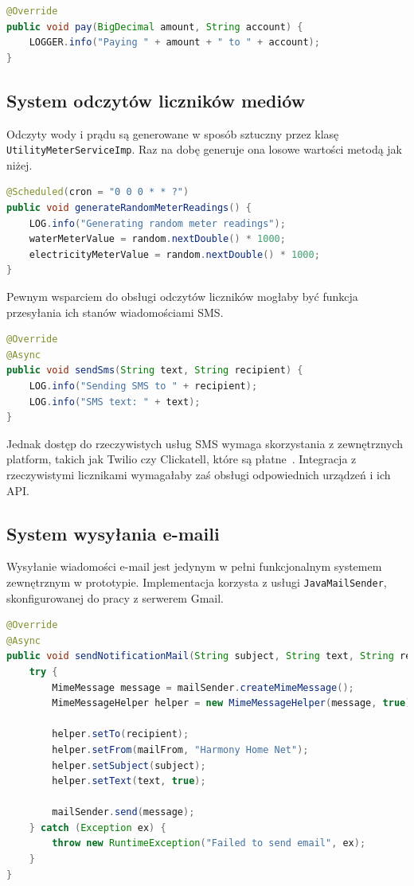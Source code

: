 \begin{lstlisting}[language=Java, style=JavaStyle, caption=Fragment klasy \texttt{BankingServiceImp}]
@Override
public void pay(BigDecimal amount, String account) {
    LOGGER.info("Paying " + amount + " to " + account);
}
\end{lstlisting}

\subsection{System odczytów liczników mediów}
Odczyty wody i prądu są generowane w sposób sztuczny przez klasę \texttt{UtilityMeterServiceImp}. Raz na dobę generuje ona losowe wartości metodą jak niżej.
\begin{lstlisting}[language=Java, style=JavaStyle, caption=Fragment klasy \texttt{UtilityMeterServiceImp}]
@Scheduled(cron = "0 0 0 * * ?")
public void generateRandomMeterReadings() {
    LOG.info("Generating random meter readings");
    waterMeterValue = random.nextDouble() * 1000;
    electricityMeterValue = random.nextDouble() * 1000;
}
\end{lstlisting}

Pewnym wsparciem do obsługi odczytów liczników mogłaby być funkcja przesyłania ich stanów wiadomościami SMS.
\begin{lstlisting}[language=Java, style=JavaStyle, caption=Fragment klasy \texttt{SmsServiceImp}]
@Override
@Async
public void sendSms(String text, String recipient) {
    LOG.info("Sending SMS to " + recipient);
    LOG.info("SMS text: " + text);
}
\end{lstlisting}
Jednak dostęp do rzeczywistych usług SMS wymaga skorzystania z zewnętrznych platform, takich jak Twilio czy Clickatell, które są płatne~\cite{twilio, clickatell}.
Integracja z rzeczywistymi licznikami wymagałaby zaś obsługi odpowiednich urządzeń i ich API.

\subsection{System wysyłania e-maili}

Wysyłanie wiadomości e-mail jest jedynym w pełni funkcjonalnym systemem zewnętrznym w prototypie. Implementacja korzysta z usługi \texttt{JavaMailSender}, skonfigurowanej do pracy z serwerem Gmail.

\begin{lstlisting}[language=Java, style=JavaStyle, caption=Fragment klasy \texttt{MailServiceImp}]
@Override
@Async
public void sendNotificationMail(String subject, String text, String recipient) {
    try {
        MimeMessage message = mailSender.createMimeMessage();
        MimeMessageHelper helper = new MimeMessageHelper(message, true);

        helper.setTo(recipient);
        helper.setFrom(mailFrom, "Harmony Home Net");
        helper.setSubject(subject);
        helper.setText(text, true);

        mailSender.send(message);
    } catch (Exception ex) {
        throw new RuntimeException("Failed to send email", ex);
    }
}
\end{lstlisting}

